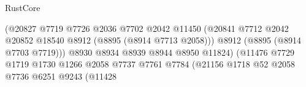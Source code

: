 \begin{lexlean}{RustCore}
\begin{coremodule}
                                                          (@20827
                                                            @7719
                                                            @7726
                                                            @2036
                                                            @7702
                                                            @2042
                                                            @11450
                                                            (@20841
                                                              @7712
                                                              @2042
                                                              @20852
                                                              @18540
                                                              @8912
                                                              (@8895 (@8914 @7713 @2058)))
                                                            @8912
                                                            (@8895 (@8914 @7703 @7719)))
                                                          @8930
                                                          @8934
                                                          @8939
                                                          @8944
                                                          @8950
                                                          @11824)
                                                        (@11476
                                                          @7729
                                                          @1719
                                                          @1730
                                                          @1266
                                                          @2058
                                                          @7737
                                                          @7761
                                                          @7784
                                                          (@21156
                                                            @1718
                                                            @52
                                                            @2058
                                                            @7736
                                                            @6251
                                                            @9243
                                                            (@11428

\end{coremodule}
\end{lexlean}
